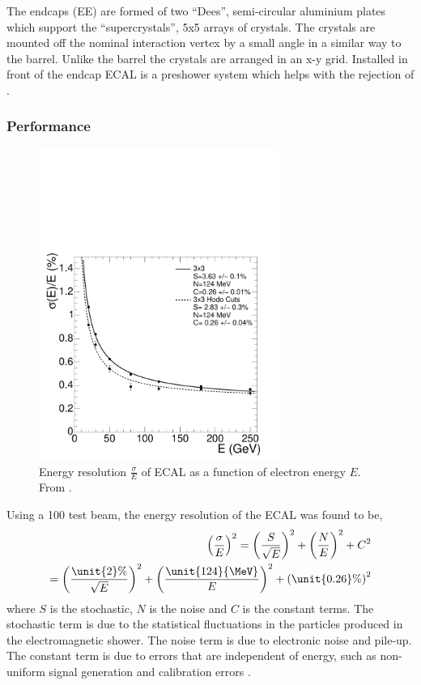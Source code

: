 The endcaps (EE) are formed of two ``Dees'', semi-circular aluminium plates
which support the ``supercrystals'', 5x5 arrays of crystals. The crystals are
mounted off the nominal interaction vertex by a small angle in a similar way
to the barrel. 
Unlike the barrel the crystals are arranged in an x-y grid.
Installed in front of the endcap ECAL is a preshower system which helps with
the rejection of \Ppizero \cite{cms}.

\subsubsection{Performance}

\begin{figure}[htbp]
  \centering
  \includegraphics[width=0.7\textwidth]{ecal_performance}
  \caption{Energy resolution $\frac{\sigma}{E}$ of ECAL as a function of
  \label{fig:ECAL}
electron energy $E$. From \cite{cms}.}
\end{figure}

Using a \unit{100}{\GeV} test beam, the energy resolution of the \ac{ECAL} was
found to be\cite{tdr},
\begin{align}
\left(\frac{\sigma}{E}\right)^{2} 
= \left(\frac{S}{\sqrt{E}}\right)^{2} + \left(\frac{N}{E}\right)^{2} + C^{2}\\
=
\left(\frac{\unit{2}{\%}}{\sqrt{E}}\right)^{2} +
\left(\frac{\unit{124}{\MeV}}{E}\right)^{2} + 
\left(\unit{0.26}{\%}\right)^{2}  
\end{align}
where $S$ is the stochastic, $N$ is the noise and $C$ is the constant terms. The
stochastic term is due to the statistical fluctuations in the particles produced
in the electromagnetic shower. The noise term is due to electronic noise and
pile-up. The constant term is due to errors that are independent of energy, such
as non-uniform signal generation and calibration errors \cite{cms}.

